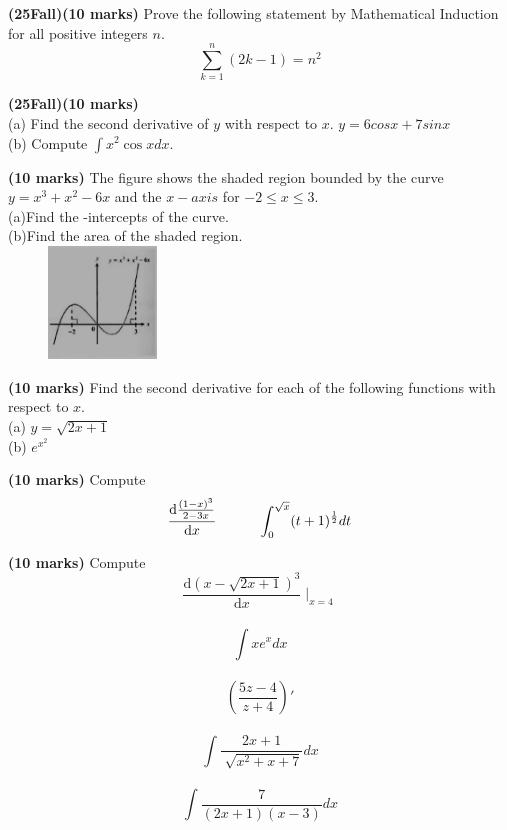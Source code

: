 \documentclass{article}
\begin{document}
\vspace{3\baselineskip}

\noindent \textbf{(25Fall)(10 marks)} Prove the following statement by Mathematical Induction for all positive integers $n$.
$$ \sum_{k=1}^{n}(2 k-1)=n^{2} $$

\vspace{3\baselineskip}


\noindent \textbf{(25Fall)(10 marks)} \\
(a) Find the second derivative of $y$ with respect to $x$. \indent $y = 6cosx + 7sinx$ \\
(b) Compute \indent  $\int x^{2} \cos x d x$.

\vspace{3\baselineskip}

\noindent \textbf{(10 marks)} The figure shows the shaded region bounded by the curve $y=x^3+x^2-6x$ and the $x-axis$ for $-2 \le x \le 3$.\\
\indent (a)Find the -intercepts of the curve.\\
\indent (b)Find the area of the shaded region.\\ 

\hfill
\includegraphics[width=5cm, height=3cm]{graph1.jpg}

\vspace{3\baselineskip}

\noindent \textbf{(10 marks)} Find the second derivative for each of the following functions with respect to $x$.\\
\indent (a) $y=\sqrt{2x+1}$\\
\indent (b) $e^{x^2}$

\vspace{3\baselineskip}

\noindent \textbf{(10 marks)} Compute \indent $$\frac{\mathrm{d} \frac{(1-x)^3}{2-3x} }{\mathrm{d} x} \indent \indent \int_{0}^{\sqrt{x}}(t+1)^\frac{1}{2} dt $$

\vspace{3\baselineskip}

\noindent \textbf{(10 marks)} Compute 
$$ \frac{\mathrm{d} (x-\sqrt{2x + 1} )^3}{\mathrm{d} x} \mid _{x=4} $$ \\
$$ \int xe^x dx $$ \\
$$ ({\frac{5z-4}{z+4} })' $$ \\
$$ \int \frac{2x+1}{\sqrt[]{x^2 + x + 7}}dx $$ \\
$$ \int \frac{7}{{(2x+1)(x-3)}}dx $$ 
\end{document}
